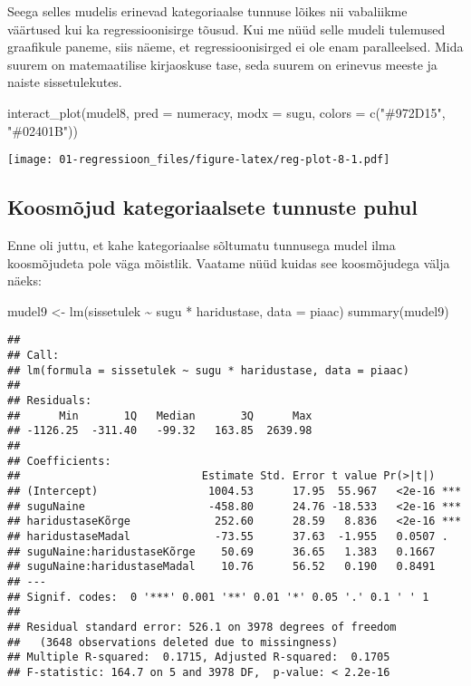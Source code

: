 \documentclass[
]{book}
\newenvironment{Shaded}{\begin{snugshade}}{\end{snugshade}}
\newcommand{\AttributeTok}[1]{\textcolor[rgb]{0.77,0.63,0.00}{#1}}
\newcommand{\FunctionTok}[1]{\textcolor[rgb]{0.00,0.00,0.00}{#1}}
\newcommand{\NormalTok}[1]{#1}
\newcommand{\OtherTok}[1]{\textcolor[rgb]{0.56,0.35,0.01}{#1}}
\newcommand{\SpecialCharTok}[1]{\textcolor[rgb]{0.00,0.00,0.00}{#1}}
\newcommand{\StringTok}[1]{\textcolor[rgb]{0.31,0.60,0.02}{#1}}
\begin{document}
Seega selles mudelis erinevad kategoriaalse tunnuse lõikes nii vabaliikme väärtused kui ka regressioonisirge tõusud. Kui me nüüd selle mudeli tulemused graafikule paneme, siis näeme, et regressioonisirged ei ole enam paralleelsed. Mida suurem on matemaatilise kirjaoskuse tase, seda suurem on erinevus meeste ja naiste sissetulekutes.

\begin{Shaded}
\begin{Highlighting}[]
\FunctionTok{interact\_plot}\NormalTok{(mudel8, }\AttributeTok{pred =}\NormalTok{ numeracy, }\AttributeTok{modx =}\NormalTok{ sugu,  }\AttributeTok{colors =}  \FunctionTok{c}\NormalTok{(}\StringTok{"\#972D15"}\NormalTok{, }\StringTok{"\#02401B"}\NormalTok{))}
\end{Highlighting}
\end{Shaded}

\texttt{[image: 01-regressioon\_files/figure-latex/reg-plot-8-1.pdf]}

\hypertarget{koosmuxf5jud-kategoriaalsete-tunnuste-puhul}{%
\subsection{Koosmõjud kategoriaalsete tunnuste puhul}\label{koosmuxf5jud-kategoriaalsete-tunnuste-puhul}}

Enne oli juttu, et kahe kategoriaalse sõltumatu tunnusega mudel ilma koosmõjudeta pole väga mõistlik. Vaatame nüüd kuidas see koosmõjudega välja näeks:

\begin{Shaded}
\begin{Highlighting}[]
\NormalTok{mudel9 }\OtherTok{\textless{}{-}} \FunctionTok{lm}\NormalTok{(sissetulek }\SpecialCharTok{\textasciitilde{}}\NormalTok{ sugu }\SpecialCharTok{*}\NormalTok{ haridustase, }\AttributeTok{data =}\NormalTok{ piaac)}
\FunctionTok{summary}\NormalTok{(mudel9)}
\end{Highlighting}
\end{Shaded}

\begin{verbatim}
## 
## Call:
## lm(formula = sissetulek ~ sugu * haridustase, data = piaac)
## 
## Residuals:
##      Min       1Q   Median       3Q      Max 
## -1126.25  -311.40   -99.32   163.85  2639.98 
## 
## Coefficients:
##                            Estimate Std. Error t value Pr(>|t|)    
## (Intercept)                 1004.53      17.95  55.967   <2e-16 ***
## suguNaine                   -458.80      24.76 -18.533   <2e-16 ***
## haridustaseKõrge             252.60      28.59   8.836   <2e-16 ***
## haridustaseMadal             -73.55      37.63  -1.955   0.0507 .  
## suguNaine:haridustaseKõrge    50.69      36.65   1.383   0.1667    
## suguNaine:haridustaseMadal    10.76      56.52   0.190   0.8491    
## ---
## Signif. codes:  0 '***' 0.001 '**' 0.01 '*' 0.05 '.' 0.1 ' ' 1
## 
## Residual standard error: 526.1 on 3978 degrees of freedom
##   (3648 observations deleted due to missingness)
## Multiple R-squared:  0.1715, Adjusted R-squared:  0.1705 
## F-statistic: 164.7 on 5 and 3978 DF,  p-value: < 2.2e-16
\end{verbatim}
\end{document}

